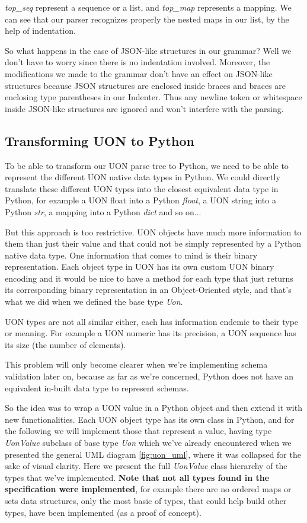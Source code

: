 \documentclass[12pt]{article}
\begin{document}
\emph{top\_seq} represent a sequence or a list, and \emph{top\_map} represents a mapping. We can see that our parser recognizes properly the nested maps in our list, by the help of indentation.

So what happens in the case of JSON-like structures in our grammar? Well we don't have to worry since there is no indentation involved. Moreover, the modifications we made to the grammar don't have an effect on JSON-like structures because JSON structures are enclosed inside braces and braces are enclosing type parentheses in our Indenter. Thus any newline token or whitespace inside JSON-like structures are ignored and won't interfere with the parsing.
\pagebreak

\subsection{Transforming UON to Python}
To be able to transform our UON parse tree to Python, we need to be able to represent the different UON native data types in Python. We could directly translate these different UON types into the closest equivalent data type in Python, for example a UON float into a Python \emph{float}, a UON string into a Python \emph{str}, a mapping into a Python \emph{dict} and so on...

But this approach is too restrictive. UON objects have much more information to them than just their value and that could not be simply represented by a Python native data type. One information that comes to mind is their binary representation. Each object type in UON has its own custom UON binary encoding and it would be nice to have a method for each type that just returns its corresponding binary representation in an Object-Oriented style, and that's what we did when we defined the base type \emph{Uon}.

UON types are not all similar either, each has information endemic to their type or meaning. For example a UON numeric has its precision, a UON sequence has its size (the number of elements). 

This problem will only become clearer when we're implementing schema validation later on, because as far as we're concerned, Python does not have an equivalent in-built data type to represent schemas.

So the idea was to wrap a UON value in a Python object and then extend it with new functionalities. Each UON object type has its own class in Python, and for the following we will implement those that represent a value, having type \emph{UonValue} subclass of base type \emph{Uon} which we've already encountered when we presented the general UML diagram \ref{fig:uon_uml}, where it was collapsed for the sake of visual clarity. Here we present the full \emph{UonValue} class hierarchy of the types that we've implemented. \textbf{Note that not all types found in the specification were implemented}, for example there are no ordered maps or sets data structures, only the most basic of types, that could help build other types, have been implemented (as a proof of concept).
\end{document}
